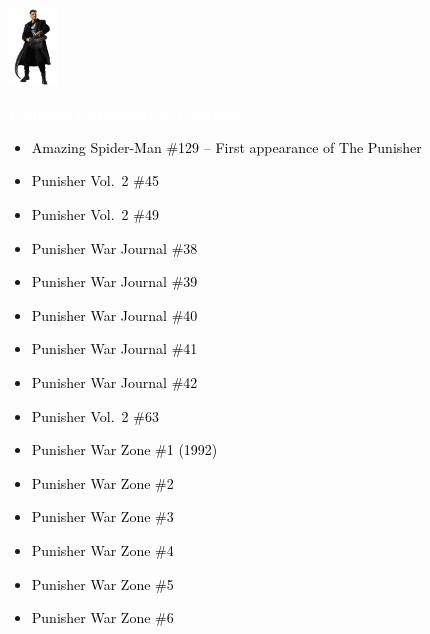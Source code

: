 \documentclass[12pt]{article}
\newcommand{\checkbox}{\raisebox{0.0ex}{\fbox{\rule{0ex}{1.5ex} \rule{1.5ex}{0ex}}}}
\begin{document}
\begin{center}
    \vspace*{2cm}
    \includegraphics[width=0.1\textwidth]{PUNISHER1.PNG}
    \vspace{0.3cm}

    {\Huge \textbf{\textcolor{white}{Punisher Chronological Checklist}}}
\end{center}

\vspace{0.3cm}
\noindent
\begin{tcolorbox}[
  colback=white!95!gray,
  colframe=black,
  width=\textwidth,
  arc=4mm,
  auto outer arc,
  boxrule=0.8pt,
  left=8pt,right=8pt,top=8pt,bottom=8pt
]
\begin{itemize}[left=0pt,label={\checkbox}]
    \item \textcolor{black}{Amazing Spider-Man \#129 – First appearance of The Punisher}
    \item \textcolor{black}{Punisher Vol.\ 2 \#45}
    \item \textcolor{black}{Punisher Vol.\ 2 \#49}
    \item \textcolor{black}{Punisher War Journal \#38}
    \item \textcolor{black}{Punisher War Journal \#39}
    \item \textcolor{black}{Punisher War Journal \#40}
    \item \textcolor{black}{Punisher War Journal \#41}
    \item \textcolor{black}{Punisher War Journal \#42}
    \item \textcolor{black}{Punisher Vol.\ 2 \#63}
    \item \textcolor{black}{Punisher War Zone \#1 (1992)}
    \item \textcolor{black}{Punisher War Zone \#2}
    \item \textcolor{black}{Punisher War Zone \#3}
    \item \textcolor{black}{Punisher War Zone \#4}
    \item \textcolor{black}{Punisher War Zone \#5}
    \item \textcolor{black}{Punisher War Zone \#6}
\end{itemize}
\end{tcolorbox}
\end{document}
